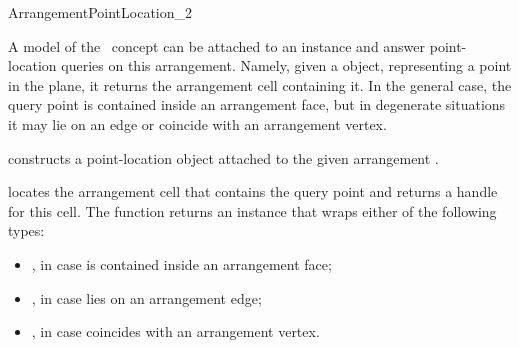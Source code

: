 
\ccRefPageBegin

\begin{ccRefConcept}{ArrangementPointLocation_2}

\ccDefinition

A model of the \ccRefName\ concept can be attached to an 
instance and answer point-location queries on this arrangement. Namely, given
a  object, representing a point in the plane,
it returns the arrangement cell containing it. In the general case, the
query point is contained inside an arrangement face, but in degenerate
situations it may lie on an edge or coincide with an arrangement vertex.

\ccTypes



\ccCreation
{}


  {constructs a point-location object \ccVar{} attached to the given
   arrangement .}

\ccQueryFunctions

  {locates the arrangement cell that contains the query point 
   and returns a handle for this cell.
   The function returns an  instance that wraps either of the
   following types:
   \parbox[t]{\ccwComment}{
   \begin{itemize}
   \item {}, in case  is
         contained inside an arrangement face;
   \item {}, in case  lies
         on an arrangement edge;
   \item {}, in case  coincides
         with an arrangement vertex.
   \end{itemize}}
   }


\end{ccRefConcept}

